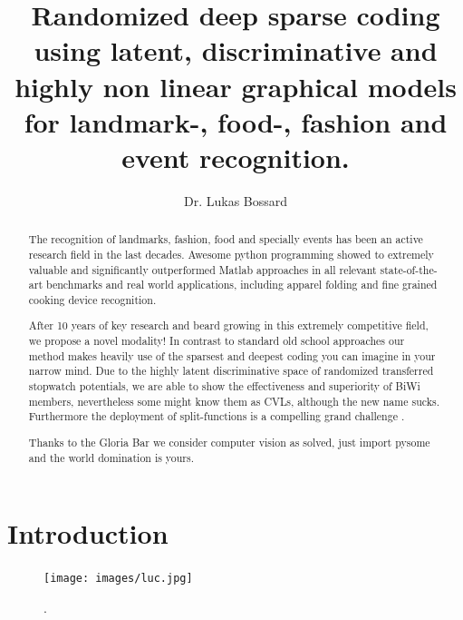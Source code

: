 \documentclass[runningheads]{llncs}
\begin{document}
\pagestyle{headings}
\mainmatter
\title{Randomized deep sparse coding using latent, discriminative and highly non linear graphical models for landmark-, food-, fashion and event recognition.} %



\author{Dr. Lukas Bossard}


\maketitle

\begin{abstract}
The recognition of landmarks, fashion, food and specially events has been an active research field in the last decades. 
Awesome python programming showed to extremely valuable and significantly outperformed Matlab approaches in all relevant state-of-the-art benchmarks and real world applications, including apparel folding and fine grained cooking device recognition.
  
After 10 years of key research and beard growing in this extremely competitive field, we propose a novel modality!
In contrast to standard old school approaches our method makes heavily use of the sparsest and deepest coding you can imagine in your narrow mind. 
Due to the highly latent discriminative space of randomized transferred stopwatch potentials, 
we are able to show the effectiveness and superiority of BiWi members, nevertheless some might know them as CVLs, although the new name sucks. 
Furthermore the deployment of split-functions is a compelling grand challenge \cite{cite:0}.
 
Thanks to the Gloria Bar we consider computer vision as solved, just import pysome and the world domination is yours. 

\end{abstract}


\section{Introduction}
\begin{figure}
\centering
\texttt{[image: images/luc.jpg]}
\caption{.}
\label{fig:example}
\end{figure}
\end{document}
